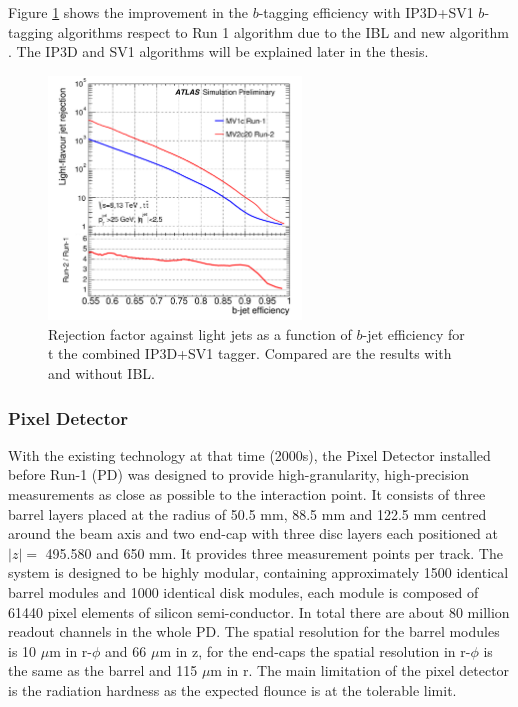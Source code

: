 Figure \ref{fig:chap2:ATLAS:ITK:IBL:Btag} shows the improvement in the $b$-tagging efficiency with IP3D+SV1 $b$-tagging algorithms respect to Run 1 algorithm due to the IBL and new algorithm \cite{IBL_Btag, IBL_Btag2}. The IP3D and SV1 algorithms will be explained later in the thesis.
\begin{figure}[htbp]
    \centering
    \includegraphics[width=0.6\textwidth]{Ch2/Img/IBL_btag2.png}
    \caption{Rejection factor against light jets as a function of $b$-jet efficiency for t the combined IP3D+SV1 tagger. Compared are the results with and without IBL.}
    \label{fig:chap2:ATLAS:ITK:IBL:Btag}
\end{figure}

\subsubsection{Pixel Detector}
\label{chap2:ATLAS:ITK:PD}
With the existing technology at that time (2000s), the Pixel Detector installed before Run-1 (PD) was designed to provide high-granularity, high-precision measurements as close as possible to the interaction point. It consists of three barrel layers placed at the radius of 50.5 mm, 88.5 mm and 122.5 mm centred around the beam axis and two end-cap with three disc layers each positioned at $|z|=$ 495.580 and 650 mm. It provides three measurement points per track. The system is designed to be highly modular, containing approximately 1500 identical barrel modules and 1000 identical disk modules, each module is composed of 61440 pixel elements of silicon semi-conductor. In total there are about 80 million readout channels in the whole PD. The spatial resolution for the barrel modules is 10 $\mu$m in r-$\phi$ and 66 $\mu$m in z, for the end-caps the spatial resolution in r-$\phi$ is the same as the barrel and 115 $\mu$m in r. The main limitation of the pixel detector is the radiation hardness as the expected flounce is at the tolerable limit. 


